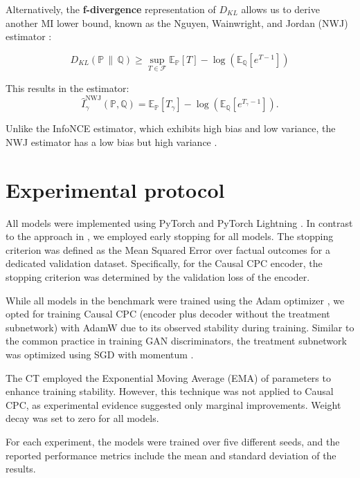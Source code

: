 \documentclass{article}
\theoremstyle{plain}
\theoremstyle{definition}
\theoremstyle{remark}
\begin{document}
Alternatively, the \textbf{f-divergence} representation of \( D_{KL} \) \cite{nowozin2016f} allows us to derive another MI lower bound, known as the Nguyen, Wainwright, and Jordan (NWJ) estimator \cite{nguyen2010estimating}:

\begin{equation}
D_{KL}(\mathbb{P} \,\|\, \mathbb{Q}) \geq \sup_{T \in \mathcal{F}} \mathbb{E}_{\mathbb{P}}[T] - \log\left(\mathbb{E}_{\mathbb{Q}}[e^{T-1}]\right)
\end{equation}

This results in the estimator:
\[
\hat{I}^{\text{NWJ}}_{\gamma}(\mathbb{P}, \mathbb{Q}) = \mathbb{E}_{\mathbb{P}}[T_{\gamma}] - \log\left(\mathbb{E}_{\mathbb{Q}}[e^{T_{\gamma}-1}]\right).
\]

Unlike the InfoNCE estimator, which exhibits high bias and low variance, the NWJ estimator has a low bias but high variance \cite{poole2019VBMI}.

\section{Experimental protocol}
\label{sect: exp_protocol}

All models were implemented using PyTorch \cite{Paszke2019PyTorchAI} and PyTorch Lightning \citep{Falcon_PyTorch_Lightning_2019}. In contrast to the approach in \cite{Melnychuk2022CausalTF}, we employed early stopping for all models. The stopping criterion was defined as the Mean Squared Error over factual outcomes for a dedicated validation dataset. Specifically, for the Causal CPC encoder, the stopping criterion was determined by the validation loss of the encoder.

While all models in the benchmark were trained using the Adam optimizer \cite{kingma2014adam}, we opted for training Causal CPC (encoder plus decoder without the treatment subnetwork) with AdamW \cite{loshchilov2017AdamW} due to its observed stability during training. Similar to the common practice in training GAN discriminators, the treatment subnetwork was optimized using SGD with momentum \cite{sutskever2013importance}.

The CT employed the Exponential Moving Average (EMA) \cite{yaz2018} of parameters to enhance training stability. However, this technique was not applied to Causal CPC, as experimental evidence suggested only marginal improvements. Weight decay was set to zero for all models.

For each experiment, the models were trained over five different seeds, and the reported performance metrics include the mean and standard deviation of the results.
\end{document}
